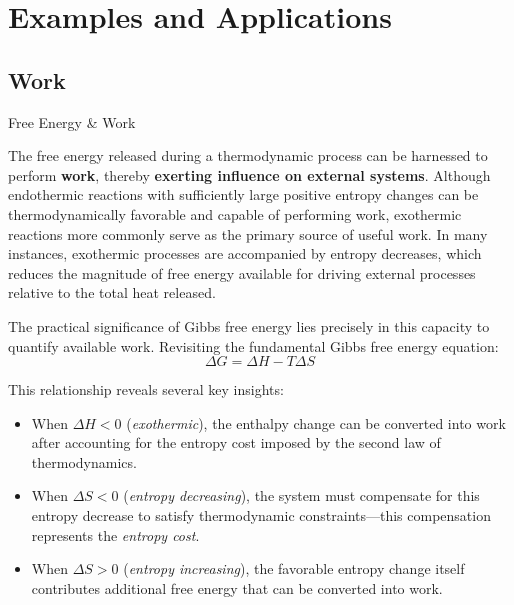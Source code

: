 \documentclass[10pt]{article}
\begin{document}
\section{Examples and Applications}

  \subsection{Work}

    \begin{core}{Free Energy \& Work}

      The free energy released during a thermodynamic process can be harnessed to perform \textbf{work}, thereby \textbf{exerting influence on external systems}. Although endothermic reactions with sufficiently large positive entropy changes can be thermodynamically favorable and capable of performing work, exothermic reactions more commonly serve as the primary source of useful work. In many instances, exothermic processes are accompanied by entropy decreases, which reduces the magnitude of free energy available for driving external processes relative to the total heat released.

      The practical significance of Gibbs free energy lies precisely in this capacity to quantify available work. Revisiting the fundamental Gibbs free energy equation:
      \[
        \Delta G = \Delta H - T\Delta S
      \]

      This relationship reveals several key insights:

      \begin{itemize}

        \item When $\Delta H < 0$ (\textit{exothermic}), the enthalpy change can be converted into work after accounting for the entropy cost imposed by the second law of thermodynamics.

        \item When $\Delta S < 0$ (\textit{entropy decreasing}), the system must compensate for this entropy decrease to satisfy thermodynamic constraints---this compensation represents the \textit{entropy cost}.

        \item When $\Delta S > 0$ (\textit{entropy increasing}), the favorable entropy change itself contributes additional free energy that can be converted into work.

      \end{itemize}

    \end{core}
\end{document}
